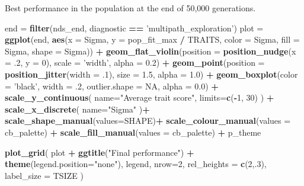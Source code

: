 \documentclass[]{book}
\newenvironment{Shaded}{\begin{snugshade}}{\end{snugshade}}
\newcommand{\DataTypeTok}[1]{\textcolor[rgb]{0.13,0.29,0.53}{#1}}
\newcommand{\DecValTok}[1]{\textcolor[rgb]{0.00,0.00,0.81}{#1}}
\newcommand{\FloatTok}[1]{\textcolor[rgb]{0.00,0.00,0.81}{#1}}
\newcommand{\KeywordTok}[1]{\textcolor[rgb]{0.13,0.29,0.53}{\textbf{#1}}}
\newcommand{\NormalTok}[1]{#1}
\newcommand{\OperatorTok}[1]{\textcolor[rgb]{0.81,0.36,0.00}{\textbf{#1}}}
\newcommand{\OtherTok}[1]{\textcolor[rgb]{0.56,0.35,0.01}{#1}}
\newcommand{\StringTok}[1]{\textcolor[rgb]{0.31,0.60,0.02}{#1}}
\begin{document}
Best performance in the population at the end of 50,000 generations.

\begin{Shaded}
\begin{Highlighting}[]
\NormalTok{end =}\StringTok{ }\KeywordTok{filter}\NormalTok{(nds_end, diagnostic }\OperatorTok{==}\StringTok{ 'multipath_exploration'}\NormalTok{)}
\NormalTok{plot =}\StringTok{ }\KeywordTok{ggplot}\NormalTok{(end, }\KeywordTok{aes}\NormalTok{(}\DataTypeTok{x =}\NormalTok{ Sigma, }\DataTypeTok{y =}\NormalTok{ pop_fit_max }\OperatorTok{/}\StringTok{ }\NormalTok{TRAITS, }\DataTypeTok{color =}\NormalTok{ Sigma, }\DataTypeTok{fill =}\NormalTok{ Sigma, }\DataTypeTok{shape =}\NormalTok{ Sigma)) }\OperatorTok{+}
\StringTok{  }\KeywordTok{geom_flat_violin}\NormalTok{(}\DataTypeTok{position =} \KeywordTok{position_nudge}\NormalTok{(}\DataTypeTok{x =} \FloatTok{.2}\NormalTok{, }\DataTypeTok{y =} \DecValTok{0}\NormalTok{), }\DataTypeTok{scale =} \StringTok{'width'}\NormalTok{, }\DataTypeTok{alpha =} \FloatTok{0.2}\NormalTok{) }\OperatorTok{+}
\StringTok{  }\KeywordTok{geom_point}\NormalTok{(}\DataTypeTok{position =} \KeywordTok{position_jitter}\NormalTok{(}\DataTypeTok{width =} \FloatTok{.1}\NormalTok{), }\DataTypeTok{size =} \FloatTok{1.5}\NormalTok{, }\DataTypeTok{alpha =} \FloatTok{1.0}\NormalTok{) }\OperatorTok{+}
\StringTok{  }\KeywordTok{geom_boxplot}\NormalTok{(}\DataTypeTok{color =} \StringTok{'black'}\NormalTok{, }\DataTypeTok{width =} \FloatTok{.2}\NormalTok{, }\DataTypeTok{outlier.shape =} \OtherTok{NA}\NormalTok{, }\DataTypeTok{alpha =} \FloatTok{0.0}\NormalTok{) }\OperatorTok{+}
\StringTok{  }\KeywordTok{scale_y_continuous}\NormalTok{(}
    \DataTypeTok{name=}\StringTok{"Average trait score"}\NormalTok{,}
    \DataTypeTok{limits=}\KeywordTok{c}\NormalTok{(}\OperatorTok{-}\DecValTok{1}\NormalTok{, }\DecValTok{30}\NormalTok{)}
\NormalTok{  ) }\OperatorTok{+}
\StringTok{  }\KeywordTok{scale_x_discrete}\NormalTok{(}
    \DataTypeTok{name=}\StringTok{"Sigma"}
\NormalTok{  )}\OperatorTok{+}
\StringTok{  }\KeywordTok{scale_shape_manual}\NormalTok{(}\DataTypeTok{values=}\NormalTok{SHAPE)}\OperatorTok{+}
\StringTok{  }\KeywordTok{scale_colour_manual}\NormalTok{(}\DataTypeTok{values =}\NormalTok{ cb_palette) }\OperatorTok{+}
\StringTok{  }\KeywordTok{scale_fill_manual}\NormalTok{(}\DataTypeTok{values =}\NormalTok{ cb_palette) }\OperatorTok{+}
\StringTok{  }\NormalTok{p_theme}

\KeywordTok{plot_grid}\NormalTok{(}
\NormalTok{  plot }\OperatorTok{+}
\StringTok{    }\KeywordTok{ggtitle}\NormalTok{(}\StringTok{"Final performance"}\NormalTok{) }\OperatorTok{+}
\StringTok{    }\KeywordTok{theme}\NormalTok{(}\DataTypeTok{legend.position=}\StringTok{"none"}\NormalTok{),}
\NormalTok{  legend,}
  \DataTypeTok{nrow=}\DecValTok{2}\NormalTok{,}
  \DataTypeTok{rel_heights =} \KeywordTok{c}\NormalTok{(}\DecValTok{2}\NormalTok{,.}\DecValTok{3}\NormalTok{),}
  \DataTypeTok{label_size =}\NormalTok{ TSIZE}
\NormalTok{)}
\end{Highlighting}
\end{Shaded}
\end{document}
